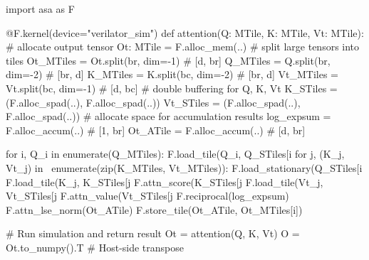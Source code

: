 \begin{listing}
\begin{mintedpython}
import asa as F

@F.kernel(device="verilator_sim")
def attention(Q: MTile, K: MTile, Vt: MTile):
  # allocate output tensor
  Ot: MTile = F.alloc_mem(..)
  # split large tensors into tiles
  Ot_MTiles = Ot.split(br, dim=-1) # [d, br]
  Q_MTiles = Q.split(br, dim=-2)   # [br, d]
  K_MTiles = K.split(bc, dim=-2)   # [br, d]
  Vt_MTiles = Vt.split(bc, dim=-1) # [d, bc]
  # double buffering for Q, K, Vt
  K_STiles = (F.alloc_spad(..),
              F.alloc_spad(..))
  Vt_STiles = (F.alloc_spad(..),
               F.alloc_spad(..))
  # allocate space for accumulation results
  log_expsum = F.alloc_accum(..)   # [1, br]
  Ot_ATile = F.alloc_accum(..)     # [d, br]

  for i, Q_i in enumerate(Q_MTiles):
    F.load_tile(Q_i, Q_STiles[i %
    for j, (K_j, Vt_j) in \
        enumerate(zip(K_MTiles, Vt_MTiles)):
      F.load_stationary(Q_STiles[i %
      F.load_tile(K_j, K_STiles[j %
      F.attn_score(K_STiles[j %
      F.load_tile(Vt_j, Vt_STiles[j %
      F.attn_value(Vt_STiles[j %
    F.reciprocal(log_expsum)
    F.attn_lse_norm(Ot_ATile)
    F.store_tile(Ot_ATile, Ot_MTiles[i])

# Run simulation and return result
Ot = attention(Q, K, Vt)
O = Ot.to_numpy().T  # Host-side transpose
\end{mintedpython}
\caption{\MSAGA{} \FA{} kernel.}
\label{lst:msaga_fa_kernel}
\end{listing}


